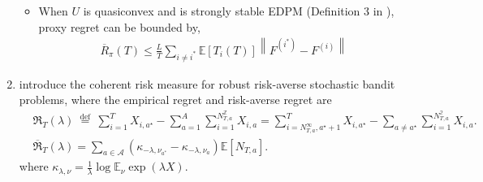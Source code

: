 \documentclass{article}
\begin{document}
\begin{enumerate}
\begin{itemize}
\begin{itemize}
                \end{itemize}
            \item When $U$ is quasiconvex and is strongly stable EDPM (Definition 3 in \cite{cassel2018general}), proxy regret can be bounded by,
                \begin{align}
                    \overline{R}_{\pi}(T) \leq \frac{L}{T} \sum_{i \neq i^{*}} \mathbb{E}\left[T_{i}(T)\right]\left\|F^{\left(i^{*}\right)}-F^{(i)}\right\|
                \end{align}
        \end{itemize}
        \item \textcite{maillard2013robust} introduce the coherent risk measure for robust risk-averse stochastic bandit problems, where the empirical regret and risk-averse regret are
        \begin{align}
            & \mathfrak{R}_{T}(\lambda) \stackrel{\text { def }}{=} \sum_{i=1}^{T} X_{i, a^{\star}}-\sum_{a=1}^{A} \sum_{i=1}^{N_{T, a}^{\mathbb{Z}}} X_{i, a}=\sum_{i=N_{T, a}^{\infty}, a^{\star}+1}^{T} X_{i, a^{\star}}-\sum_{a \neq a^{\star}} \sum_{i=1}^{N_{T, a}^{\mathbb{2}}} X_{i, a}.\\
            & \overline{\mathfrak{R}}_{T}(\lambda)=\sum_{a \in \mathcal{A}}\left(\kappa_{-\lambda, \nu_{a^{*}}}-\kappa_{-\lambda, \nu_{a}}\right) \mathbb{E}\left[N_{T, a}\right].
        \end{align}
        where $\kappa_{\lambda, \nu}=\frac{1}{\lambda} \log \mathbb{E}_{\nu} \exp (\lambda X)$.
    \end{enumerate}
       

\printbibliography
\end{document}
